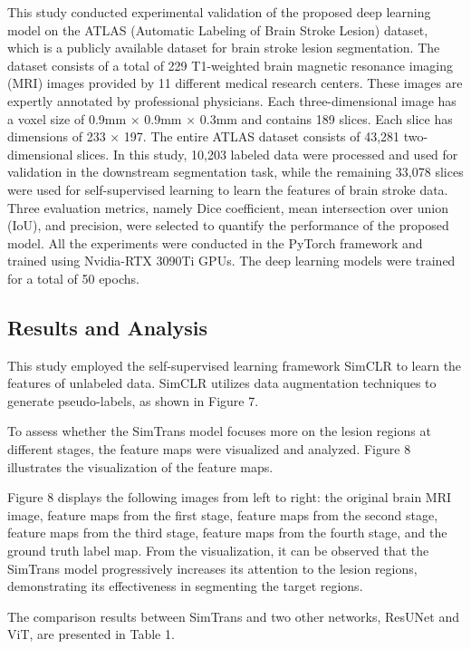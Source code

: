 \documentclass[10pt,twocolumn,letterpaper]{article}
\begin{document}
This study conducted experimental validation of the proposed deep learning model on the ATLAS (Automatic Labeling of Brain Stroke Lesion) dataset, which is a publicly available dataset for brain stroke lesion segmentation. The dataset consists of a total of 229 T1-weighted brain magnetic resonance imaging (MRI) images provided by 11 different medical research centers. These images are expertly annotated by professional physicians. Each three-dimensional image has a voxel size of 0.9mm × 0.9mm × 0.3mm and contains 189 slices. Each slice has dimensions of 233 × 197. The entire ATLAS dataset consists of 43,281 two-dimensional slices. In this study, 10,203 labeled data were processed and used for validation in the downstream segmentation task, while the remaining 33,078 slices were used for self-supervised learning to learn the features of brain stroke data.
Three evaluation metrics, namely Dice coefficient, mean intersection over union (IoU), and precision, were selected to quantify the performance of the proposed model.
All the experiments were conducted in the PyTorch framework and trained using Nvidia-RTX 3090Ti GPUs. The deep learning models were trained for a total of 50 epochs.

\subsection{Results and Analysis}

This study employed the self-supervised learning framework SimCLR to learn the features of unlabeled data. SimCLR utilizes data augmentation techniques to generate pseudo-labels, as shown in Figure 7.

To assess whether the SimTrans model focuses more on the lesion regions at different stages, the feature maps were visualized and analyzed. Figure 8 illustrates the visualization of the feature maps.

Figure 8 displays the following images from left to right: the original brain MRI image, feature maps from the first stage, feature maps from the second stage, feature maps from the third stage, feature maps from the fourth stage, and the ground truth label map. From the visualization, it can be observed that the SimTrans model progressively increases its attention to the lesion regions, demonstrating its effectiveness in segmenting the target regions.

The comparison results between SimTrans and two other networks, ResUNet and ViT, are presented in Table 1.
\end{document}
